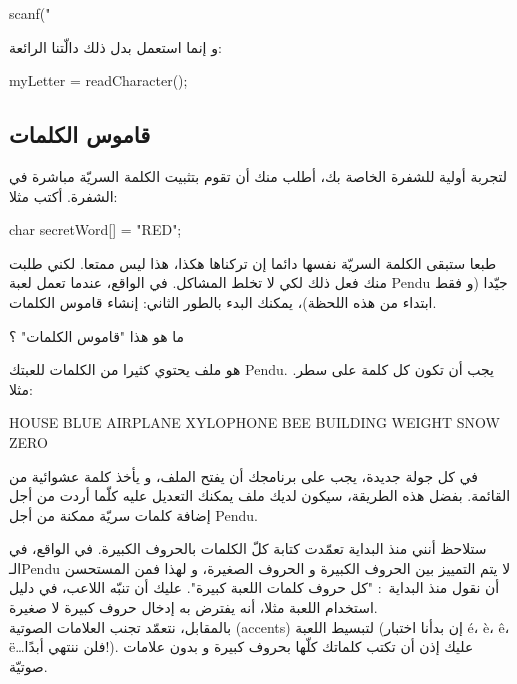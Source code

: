 \begin{Csource}
scanf("%
\end{Csource}

و إنما استعمل بدل ذلك دالّتنا الرائعة:

\begin{Csource}
myLetter = readCharacter();
\end{Csource}

\subsection{قاموس الكلمات}
لتجربة أولية للشفرة الخاصة بك، أطلب منك أن تقوم بتثبيت الكلمة السريّة مباشرة في الشفرة. أكتب مثلا:

\begin{Csource}
char secretWord[] = "RED";
\end{Csource}

طبعا ستبقى الكلمة السريّة نفسها دائما إن تركناها هكذا، هذا ليس ممتعا. لكني طلبت منك فعل ذلك لكي لا تخلط المشاكل. في الواقع، عندما تعمل لعبة
\textenglish{Pendu}
جيّدا (و فقط ابتداء من هذه اللحظة)، يمكنك البدء بالطور الثاني: إنشاء قاموس الكلمات.

\begin{question}
ما هو هذا "قاموس الكلمات" ؟
\end{question}

هو ملف يحتوي كثيرا من الكلمات للعبتك
\textenglish{Pendu}.
يجب أن تكون كل كلمة على سطر. مثلا:

\begin{Console}
HOUSE
BLUE
AIRPLANE
XYLOPHONE
BEE
BUILDING
WEIGHT
SNOW
ZERO
\end{Console}

في كل جولة جديدة، يجب على برنامجك أن يفتح الملف، و يأخذ كلمة عشوائية من القائمة. بفضل هذه الطريقة، سيكون لديك ملف يمكنك التعديل عليه كلّما أردت من أجل إضافة كلمات سريّة ممكنة من أجل
\textenglish{Pendu}.

\begin{information}
ستلاحظ أنني منذ البداية تعمّدت كتابة كلّ الكلمات بالحروف الكبيرة. في الواقع، في الـ\textenglish{Pendu}
لا يتم التمييز بين الحروف الكبيرة و الحروف الصغيرة، و لهذا فمن المستحسن أن نقول منذ البداية~: "كل حروف كلمات اللعبة كبيرة". عليك أن تنبّه اللاعب، في دليل استخدام اللعبة مثلا، أنه يفترض به إدخال حروف كبيرة لا صغيرة.\\
بالمقابل، نتعمّد تجنب العلامات الصوتية
(\textenglish{accents})
لتبسيط اللعبة (إن بدأنا اختبار \textenglish{é}، \textenglish{è}، \textenglish{ê}، \textenglish{ë}\dots فلن ننتهي أبدًا!). عليك إذن أن تكتب كلماتك كلّها بحروف كبيرة و بدون علامات صوتيّة.
\end{information}

